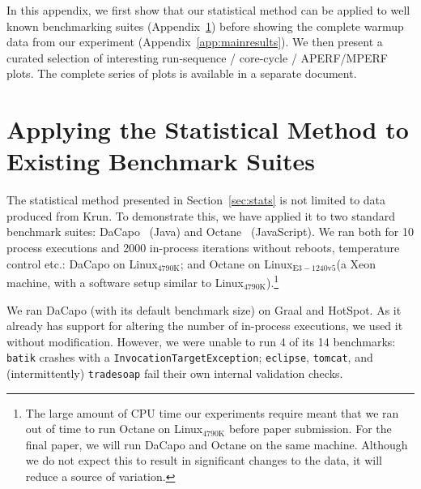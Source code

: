 \documentclass[acmlarge]{acmart}\settopmatter{printfolios=true}
\newcommand{\bencherthree}{Linux$_\mathrm{4790K}$\xspace}
\newcommand{\bencherseven}{Linux$_\mathrm{E3-1240v5}$\xspace}
\begin{document}



\clearpage

\appendix

\noindent In this appendix, we first show that our statistical method
can be applied to well known benchmarking suites (Appendix~\ref{sec:existing})
before showing the complete warmup data from our experiment
(Appendix~\ref{app:mainresults}). We
then present a curated selection of interesting run-sequence / core-cycle /
APERF/MPERF plots. The complete series of plots is available in a separate
document.


\section{Applying the Statistical Method to Existing Benchmark Suites}
\label{sec:existing}
The statistical method presented in Section~\ref{sec:stats} is not limited to data
produced from Krun. To demonstrate this, we have applied it to two standard
benchmark suites: DaCapo~\cite{dacapo06} (Java) and Octane~\cite{octane}
(JavaScript). We ran both for 10 process executions and 2000 in-process
iterations without reboots, temperature control etc.: DaCapo on \bencherthree;
and Octane on \bencherseven (a Xeon machine, with a software setup
similar to \bencherthree).\footnote{The large amount of CPU time our
experiments require meant that we ran out of time to run Octane on \bencherthree
before paper submission. For the final paper, we will run DaCapo and Octane on
the same machine. Although we do not expect this to result in significant
changes to the data, it will reduce a source of variation.}

We ran DaCapo (with its default benchmark size) on Graal and HotSpot. As it already has support for
altering the number of in-process executions, we used it without modification.
However, we were unable to run 4 of its 14 benchmarks: \texttt{batik}
crashes with a \texttt{Invocation\-Target\-Exception}; \texttt{eclipse},
\texttt{tomcat}, and (intermittently) \texttt{tradesoap} fail their own internal
validation checks.
\end{document}
